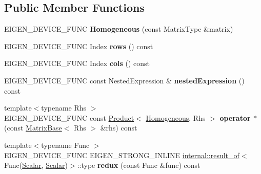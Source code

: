 \subsection*{Public Member Functions}
\begin{DoxyCompactItemize}
\item 
\mbox{\label{class_eigen_1_1_homogeneous_a6d7d4d6e3fd9c9092f3cdc7c7d730462}} 
E\+I\+G\+E\+N\+\_\+\+D\+E\+V\+I\+C\+E\+\_\+\+F\+U\+NC {\bfseries Homogeneous} (const Matrix\+Type \&matrix)
\item 
\mbox{\label{class_eigen_1_1_homogeneous_a585a4512c1b27905c801e2dc7140a71a}} 
E\+I\+G\+E\+N\+\_\+\+D\+E\+V\+I\+C\+E\+\_\+\+F\+U\+NC Index {\bfseries rows} () const
\item 
\mbox{\label{class_eigen_1_1_homogeneous_aa9150d97385cc380135bafc2b6a0b6e6}} 
E\+I\+G\+E\+N\+\_\+\+D\+E\+V\+I\+C\+E\+\_\+\+F\+U\+NC Index {\bfseries cols} () const
\item 
\mbox{\label{class_eigen_1_1_homogeneous_a4c1e03451bd7cdeb7a17163d034ba20a}} 
E\+I\+G\+E\+N\+\_\+\+D\+E\+V\+I\+C\+E\+\_\+\+F\+U\+NC const Nested\+Expression \& {\bfseries nested\+Expression} () const
\item 
\mbox{\label{class_eigen_1_1_homogeneous_a33d8ad852b7fe38c9cfd0e21e0344cd0}} 
{\footnotesize template$<$typename Rhs $>$ }\\E\+I\+G\+E\+N\+\_\+\+D\+E\+V\+I\+C\+E\+\_\+\+F\+U\+NC const \mbox{\hyperlink{class_eigen_1_1_product}{Product}}$<$ \mbox{\hyperlink{class_eigen_1_1_homogeneous}{Homogeneous}}, Rhs $>$ {\bfseries operator $\ast$} (const \mbox{\hyperlink{class_eigen_1_1_matrix_base}{Matrix\+Base}}$<$ Rhs $>$ \&rhs) const
\item 
\mbox{\label{class_eigen_1_1_homogeneous_a738cf70051ef5e5243e1d9b9f5251e49}} 
{\footnotesize template$<$typename Func $>$ }\\E\+I\+G\+E\+N\+\_\+\+D\+E\+V\+I\+C\+E\+\_\+\+F\+U\+NC E\+I\+G\+E\+N\+\_\+\+S\+T\+R\+O\+N\+G\+\_\+\+I\+N\+L\+I\+NE \mbox{\hyperlink{struct_eigen_1_1internal_1_1result__of}{internal\+::result\+\_\+of}}$<$ Func(\mbox{\hyperlink{class_eigen_1_1_dense_base_a5feed465b3a8e60c47e73ecce83e39a2}{Scalar}}, \mbox{\hyperlink{class_eigen_1_1_dense_base_a5feed465b3a8e60c47e73ecce83e39a2}{Scalar}})$>$\+::type {\bfseries redux} (const Func \&func) const
\end{DoxyCompactItemize}
